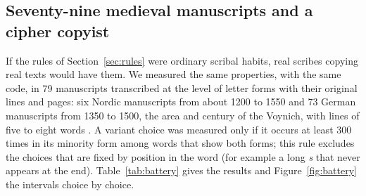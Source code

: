 \subsection{Seventy-nine medieval manuscripts and a cipher copyist}
\label{sec:scribes}

If the rules of Section~\ref{sec:rules} were ordinary scribal habits, real scribes copying real texts would have them.
We measured the same properties, with the same code, in 79 manuscripts transcribed at the level of letter forms with
their original lines and pages: six Nordic manuscripts from about 1200 to 1550 \citep{menota} and 73 German manuscripts
from 1350 to 1500, the area and century of the Voynich, with lines of five to eight words \citep{ref2021}. A variant
choice was measured only if it occurs at least 300 times in its minority form among words that show both forms; this
rule excludes the choices that are fixed by position in the word (for example a long \emph{s} that never appears at the
end). Table~\ref{tab:battery} gives the results and Figure~\ref{fig:battery} the intervals choice by choice.


